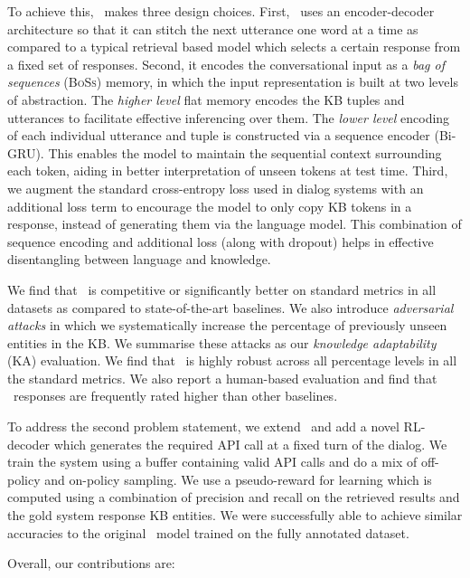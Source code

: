 To achieve this, \sys\ makes three design choices. 
First, \sys\ uses an encoder-decoder architecture so that it can stitch the next utterance one word at a time as compared to a typical retrieval based model which selects a certain response from a fixed set of responses. 
Second, it encodes the conversational input as a {\em bag of sequences} (\textsc{BoSs}) memory, in which the input representation is built at two levels of abstraction. The \emph{higher level} flat memory encodes the KB tuples and utterances to facilitate effective inferencing over them. The \emph{lower level} encoding of each individual utterance and tuple is constructed via a sequence encoder (Bi-GRU). This enables the model to maintain the sequential context surrounding each token, aiding in better interpretation of unseen tokens at test time. 
Third, we augment the standard cross-entropy loss used in dialog systems with an additional loss term to encourage the model to only copy KB tokens in a response, instead of generating them via the language model. This combination of sequence encoding and additional loss (along with dropout) helps in effective disentangling between language and knowledge. 

We find that \sys\ is competitive or significantly better on standard metrics in all datasets as compared to state-of-the-art baselines. We also introduce {\em adversarial attacks} in which we systematically increase the percentage of previously unseen entities in the KB. We summarise these attacks as our {\em knowledge adaptability} (KA) evaluation. We find that \sys\ is highly robust across all percentage levels in all the standard metrics. We also report a human-based evaluation and find that \sys\ responses are frequently rated higher than other baselines.

To address the second problem statement, we extend \sys\ and add a novel RL-decoder which generates the required API call at a fixed turn of the dialog. We train the system using a buffer containing valid API calls and do a mix of off-policy and on-policy sampling. We use a pseudo-reward for learning which is computed using a combination of precision and recall on the retrieved results and the gold system response KB entities. We were successfully able to achieve similar accuracies to the original \sys\ model trained on the fully annotated dataset.

Overall, our contributions are:

